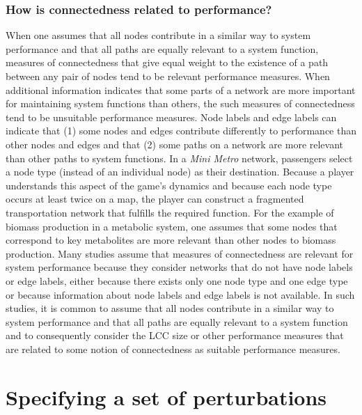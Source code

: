 \documentclass{comnet-mod}
\begin{document}
\subsubsection{How is connectedness related to performance?}
When one assumes that all nodes contribute in a similar way to system performance and that all paths are equally relevant to a system function, measures of connectedness that give equal weight to the existence of a path between any pair of nodes tend to be relevant performance measures. When additional information indicates that some parts of a network are more important for maintaining system functions than others, the such measures of connectedness tend to be unsuitable performance measures.
Node labels and edge labels can indicate that (1) some nodes and edges contribute differently to performance than other nodes and edges and that (2) some paths on a network are more relevant than other paths to system functions.
In a \textit{Mini Metro} network, passengers select a node type (instead of an individual node) as their destination. Because a player understands this aspect of the game's dynamics and because each node type occurs at least twice on a map, the player can construct a fragmented transportation network that fulfills the required function. For the example of biomass production in a metabolic system, one assumes that some nodes that correspond to key metabolites are more relevant than other nodes to biomass production. Many studies assume that measures of connectedness are relevant for system performance because they consider networks that do not have node labels or edge labels, either because there exists only one node type and one edge type or because information about node labels and edge labels is not available. In such studies, it is common to assume that all nodes contribute in a similar way to system performance and that all paths are equally relevant to a system function and to consequently consider the LCC size or other performance measures that are related to some notion of connectedness as suitable performance measures.


\section{Specifying a set of perturbations}\label{sec:perturbations}
\end{document}
